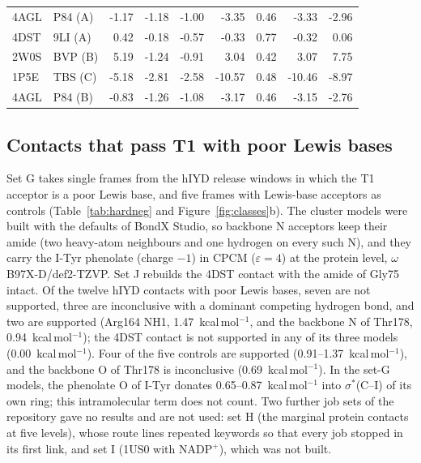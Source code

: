 \documentclass[journal=jcisd8,manuscript=suppinfo]{achemso}
\newcommand{\BX}{BondX Studio}
\begin{document}
\begin{singlespace}
\begin{table}[!htbp]
\begin{tabular}{llrrrrrrr}
4AGL & P84 (A) & -1.17 & -1.18 & -1.00 & -3.35 & 0.46 & -3.33 & -2.96\\
4DST & 9LI (A) & 0.42 & -0.18 & -0.57 & -0.33 & 0.77 & -0.32 & 0.06\\
2W0S & BVP (B) & 5.19 & -1.24 & -0.91 & 3.04 & 0.42 & 3.07 & 7.75\\
1P5E & TBS (C) & -5.18 & -2.81 & -2.58 & -10.57 & 0.48 & -10.46 & -8.97\\
4AGL & P84 (B) & -0.83 & -1.26 & -1.08 & -3.17 & 0.46 & -3.15 & -2.76\\
\bottomrule\end{tabular}\end{table}

\subsection*{Contacts that pass T1 with poor Lewis bases}
\label{sec:hardneg}
Set G takes single frames from the hIYD release windows in which the T1 acceptor is a poor Lewis base, and five frames with Lewis-base acceptors as controls (Table~\ref{tab:hardneg} and Figure~\ref{fig:classes}b). The cluster models were built with the defaults of \BX{}, so backbone N acceptors keep their amide (two heavy-atom neighbours and one hydrogen on every such N), and they carry the I-Tyr phenolate (charge $-1$) in CPCM ($\varepsilon=4$) at the protein level, $\omega$B97X-D/def2-TZVP. Set J rebuilds the 4DST contact with the amide of Gly75 intact. Of the twelve hIYD contacts with poor Lewis bases, seven are not supported, three are inconclusive with a dominant competing hydrogen bond, and two are supported (Arg164 NH1, 1.47~kcal\,mol$^{-1}$, and the backbone N of Thr178, 0.94~kcal\,mol$^{-1}$); the 4DST contact is not supported in any of its three models (0.00~kcal\,mol$^{-1}$). Four of the five controls are supported (0.91--1.37~kcal\,mol$^{-1}$), and the backbone O of Thr178 is inconclusive (0.69~kcal\,mol$^{-1}$). In the set-G models, the phenolate O of I-Tyr donates 0.65--0.87~kcal\,mol$^{-1}$ into $\sigma^*$(C--I) of its own ring; this intramolecular term does not count. Two further job sets of the repository gave no results and are not used: set H (the marginal protein contacts at five levels), whose route lines repeated keywords so that every job stopped in its first link, and set I (1US0 with NADP$^+$), which was not built.


\end{singlespace}
\end{document}
